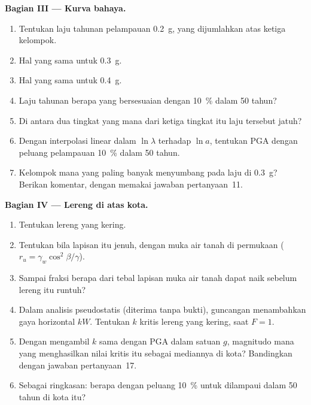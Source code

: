 \begin{problem}
\noindent\textbf{Bagian III --- Kurva bahaya.}
\begin{enumerate}[resume]
  \item Tentukan laju tahunan pelampauan \qty{0.2}{g}, yang dijumlahkan atas ketiga kelompok.
  \item Hal yang sama untuk \qty{0.3}{g}.
  \item Hal yang sama untuk \qty{0.4}{g}.
  \item Laju tahunan berapa yang bersesuaian dengan \qty{10}{\percent} dalam 50 tahun?
  \item Di antara dua tingkat yang mana dari ketiga tingkat itu laju tersebut jatuh?
  \item Dengan interpolasi linear dalam $\ln\lambda$ terhadap $\ln a$, tentukan PGA dengan
        peluang pelampauan \qty{10}{\percent} dalam 50 tahun.
  \item Kelompok mana yang paling banyak menyumbang pada laju di \qty{0.3}{g}? Berikan komentar, dengan memakai jawaban
        pertanyaan~11.
\end{enumerate}

\noindent\textbf{Bagian IV --- Lereng di atas kota.}
\begin{enumerate}[resume]
  \item Tentukan  lereng yang kering.
  \item Tentukan  bila lapisan itu jenuh, dengan muka air tanah di permukaan ($r_u =
        \gamma_w\cos^2\beta/\gamma$).
  \item Sampai fraksi berapa dari tebal lapisan muka air tanah dapat naik sebelum lereng itu runtuh?
  \item Dalam analisis pseudostatis (diterima tanpa bukti), guncangan menambahkan gaya horizontal $kW$. Tentukan
        $k$ kritis lereng yang kering, saat $F = 1$.
  \item Dengan mengambil $k$ sama dengan PGA dalam satuan $g$, magnitudo mana yang menghasilkan nilai kritis itu sebagai
        mediannya di kota? Bandingkan dengan jawaban pertanyaan~17.
  \item Sebagai ringkasan: berapa  dengan peluang \qty{10}{\percent} untuk
        dilampaui dalam 50 tahun di kota itu?
\end{enumerate}
\end{problem}
